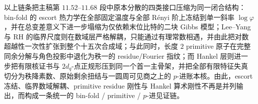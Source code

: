 

\noindent
以上链条把主稿第 \(11.52\)–\(11.68\) 段中原本分散的四类接口压缩为同一闭合结构：bin-fold 的 escort 热力学在全部固定温度与全部 Rényi 阶上冻结到单一斜率 \(\log\varphi\)，并在总变差意义下进一步塌缩为仅依赖末位比特的二块 Gibbs 模型；Lee--Yang 与 RH 的临界尺度则在数域层严格解耦，只能通过有理常数相遇，并由此把对数超越性一次性扩张到整个十五次合成域；与此同时，长度 \(2\) primitive 原子在完整同余分解与角色投影中退化为秩一的 residue/Fourier 指纹；而 Hankel 层则进一步把有限核证书与 \(2d_q\)-点正规形压到同一个首一主骨架，并把全部有限特征失真切分为秩降素数、原始剩余扭结与一圆周可见商之上的 \(p\)-进账本核。由此，escort 冻结、临界数域解耦、primitive residue 刚性与 Hankel 算术刚性不再是并列输出，而构成一条统一的 bin-fold / primitive / \(p\)-进见证链。
